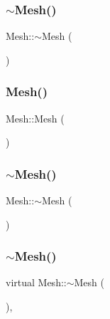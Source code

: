 \subsubsection{\texorpdfstring{$\sim$Mesh()}{~Mesh()}\hspace{0.1cm}{\footnotesize\ttfamily [8/10]}}
{\footnotesize\ttfamily Mesh\+::$\sim$\+Mesh (\begin{DoxyParamCaption}{ }\end{DoxyParamCaption})\hspace{0.3cm}{\ttfamily [inline]}}

\mbox{\label{class_mesh_a2af137f1571af89172b9c102302c416b}} 
\subsubsection{\texorpdfstring{Mesh()}{Mesh()}\hspace{0.1cm}{\footnotesize\ttfamily [3/3]}}
{\footnotesize\ttfamily Mesh\+::\+Mesh (\begin{DoxyParamCaption}{ }\end{DoxyParamCaption})}

\mbox{\label{class_mesh_a5efe4da1a4c0971cfb037bd70304c303}} 
\subsubsection{\texorpdfstring{$\sim$Mesh()}{~Mesh()}\hspace{0.1cm}{\footnotesize\ttfamily [9/10]}}
{\footnotesize\ttfamily Mesh\+::$\sim$\+Mesh (\begin{DoxyParamCaption}{ }\end{DoxyParamCaption})}

\mbox{\label{class_mesh_ad6a041191ed55c693254e945ce2869ff}} 
\subsubsection{\texorpdfstring{$\sim$Mesh()}{~Mesh()}\hspace{0.1cm}{\footnotesize\ttfamily [10/10]}}
{\footnotesize\ttfamily virtual Mesh\+::$\sim$\+Mesh (\begin{DoxyParamCaption}{ }\end{DoxyParamCaption})\hspace{0.3cm}{\ttfamily [inline]}, {\ttfamily [virtual]}}



